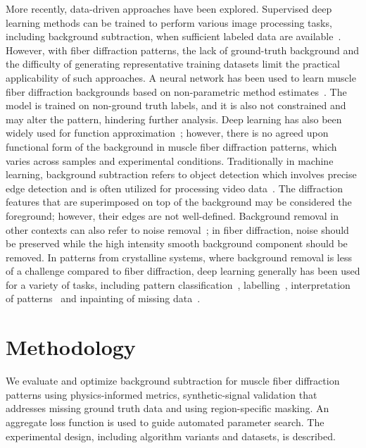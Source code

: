 \documentclass[11pt,onecolumn]{IEEEtran}
\begin{document}
More recently, data-driven approaches have been explored. Supervised deep learning methods can be trained to perform various image processing tasks, including background subtraction, when sufficient labeled data are available~\cite{archana2024dl_image_processing_review}. However, with fiber diffraction patterns, the lack of ground-truth background and the difficulty of generating representative training datasets limit the practical applicability of such approaches. A neural network has been used to learn muscle fiber diffraction backgrounds based on non-parametric method estimates~\cite{ArangurenCarmona2020}. The model is trained on non-ground truth labels, and it is also not constrained and may alter the pattern, hindering further analysis. Deep learning has also been widely used for function approximation~\cite{devore2021nn_approximation}; however, there is no agreed upon functional form of the background in muscle fiber diffraction patterns, which varies across samples and experimental conditions. Traditionally in machine learning, background subtraction refers to object detection which involves precise edge detection and is often utilized for processing video data~\cite{bouwmans2019dnn_background_subtraction}. The diffraction features that are superimposed on top of the background may be considered the foreground; however, their edges are not well-defined. Background removal in other contexts can also refer to noise removal~\cite{jiang2025efficient_denoising_survey}; in fiber diffraction, noise should be preserved while the high intensity smooth background component should be removed.  In patterns from crystalline systems, where background removal is less of a challenge compared to fiber diffraction, deep learning generally has been used for a variety of tasks, including pattern classification~\cite{aguiar2020crystallographic_prediction, ziletti2018dl_crystal_classification}, labelling~\cite{chavez2025mlexchange_labeling}, interpretation of patterns~\cite{szymanski2021probabilistic_multiphase_xrd} and inpainting of missing data~\cite{chavez2022dl_inpainting_xray,roberts2024dlsia}.

\section{Methodology}

We evaluate and optimize background subtraction for muscle fiber diffraction patterns using physics-informed metrics, synthetic-signal validation that addresses missing ground truth data and using region-specific masking. An aggregate loss function is used to guide automated parameter search. The experimental design, including algorithm variants and datasets, is described.
\end{document}
